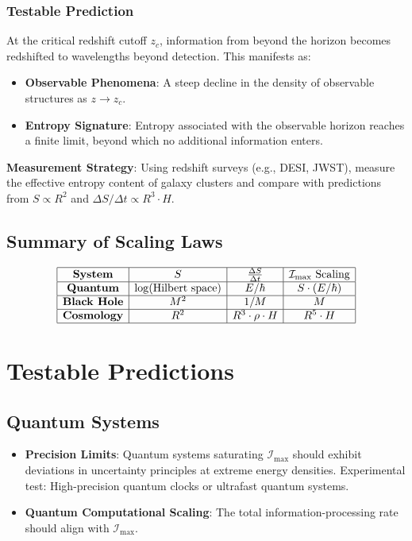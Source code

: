 \documentclass[12pt]{article}
\begin{document}
\subsubsection{Testable Prediction}
At the critical redshift cutoff \( z_c \), information from beyond the horizon becomes redshifted to wavelengths beyond detection. This manifests as:
\begin{itemize}
    \item \textbf{Observable Phenomena}: A steep decline in the density of observable structures as \( z \to z_c \).
    \item \textbf{Entropy Signature}: Entropy associated with the observable horizon reaches a finite limit, beyond which no additional information enters.
\end{itemize}

\textbf{Measurement Strategy}: Using redshift surveys (e.g., DESI, JWST), measure the effective entropy content of galaxy clusters and compare with predictions from \( S \propto R^2 \) and \( \Delta S / \Delta t \propto R^3 \cdot H \).


\subsection*{Summary of Scaling Laws}
\[
\begin{array}{|c|c|c|c|}
\hline
\textbf{System} & S & \frac{\Delta S}{\Delta t} & \mathcal{I}_{\text{max}} \text{ Scaling} \\
\hline
\textbf{Quantum} & \log(\text{Hilbert space}) & E / \hbar & S \cdot (E / \hbar) \\
\hline
\textbf{Black Hole} & M^2 & 1 / M & M \\
\hline
\textbf{Cosmology} & R^2 & R^3 \cdot \rho \cdot H & R^5 \cdot H \\
\hline
\end{array}
\]

\section{Testable Predictions}
\subsection{Quantum Systems}
\begin{itemize}
    \item \textbf{Precision Limits}: Quantum systems saturating \( \mathcal{I}_{\text{max}} \) should exhibit deviations in uncertainty principles at extreme energy densities. Experimental test: High-precision quantum clocks or ultrafast quantum systems.
    \item \textbf{Quantum Computational Scaling}: The total information-processing rate should align with \( \mathcal{I}_{\text{max}} \).
\end{itemize}
\end{document}
